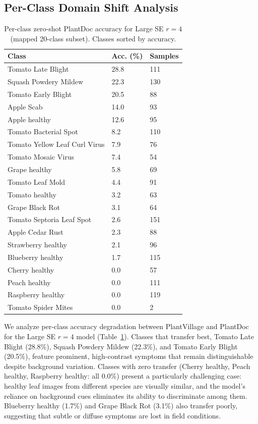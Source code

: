 \documentclass[preprint,12pt]{elsarticle}
\begin{document}
\subsection{Per-Class Domain Shift Analysis}

\begin{table}[t]
\centering
\caption{Per-class zero-shot PlantDoc accuracy for Large SE $r=4$ (mapped 20-class subset). Classes sorted by accuracy.}
\label{tab:per_class}
\begin{tabularx}{0.75\textwidth}{lXX}
\toprule
\textbf{Class} & \textbf{Acc. (\%)} & \textbf{Samples} \\
\midrule
Tomato Late Blight & 28.8 & 111 \\
Squash Powdery Mildew & 22.3 & 130 \\
Tomato Early Blight & 20.5 & 88 \\
Apple Scab & 14.0 & 93 \\
Apple healthy & 12.6 & 95 \\
\addlinespace
Tomato Bacterial Spot & 8.2 & 110 \\
Tomato Yellow Leaf Curl Virus & 7.9 & 76 \\
Tomato Mosaic Virus & 7.4 & 54 \\
Grape healthy & 5.8 & 69 \\
Tomato Leaf Mold & 4.4 & 91 \\
\addlinespace
Tomato healthy & 3.2 & 63 \\
Grape Black Rot & 3.1 & 64 \\
Tomato Septoria Leaf Spot & 2.6 & 151 \\
Apple Cedar Rust & 2.3 & 88 \\
Strawberry healthy & 2.1 & 96 \\
\addlinespace
Blueberry healthy & 1.7 & 115 \\
Cherry healthy & 0.0 & 57 \\
Peach healthy & 0.0 & 111 \\
Raspberry healthy & 0.0 & 119 \\
Tomato Spider Mites & 0.0 & 2 \\
\bottomrule
\end{tabularx}
\end{table}

We analyze per-class accuracy degradation between PlantVillage and PlantDoc for the Large SE $r=4$ model (Table~\ref{tab:per_class}). Classes that transfer best, Tomato Late Blight (28.8\%), Squash Powdery Mildew (22.3\%), and Tomato Early Blight (20.5\%), feature prominent, high-contrast symptoms that remain distinguishable despite background variation. Classes with zero transfer (Cherry healthy, Peach healthy, Raspberry healthy: all 0.0\%) present a particularly challenging case: healthy leaf images from different species are visually similar, and the model's reliance on background cues eliminates its ability to discriminate among them. Blueberry healthy (1.7\%) and Grape Black Rot (3.1\%) also transfer poorly, suggesting that subtle or diffuse symptoms are lost in field conditions.
\end{document}
